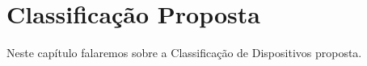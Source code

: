 \chapter{Classificação Proposta}

Neste capítulo falaremos sobre a Classificação de Dispositivos proposta.